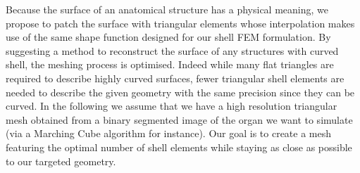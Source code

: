 \documentclass{llncs}
\begin{document}

Because the surface of an anatomical structure has a physical meaning, we propose to patch the surface with triangular elements whose interpolation makes use of the same shape function designed for our shell FEM formulation. By suggesting a method to reconstruct the surface of any structures with curved shell, the meshing process is optimised. Indeed while many flat triangles are required to describe highly curved surfaces, fewer triangular shell elements are needed to describe the given geometry with the same precision since they can be curved. In the following we assume that we have a high resolution triangular mesh obtained from a binary segmented image of the organ we want to simulate (via a Marching Cube algorithm for instance). Our goal is to create a mesh featuring the optimal number of shell elements while staying as close as possible to our targeted geometry. 
\end{document}
